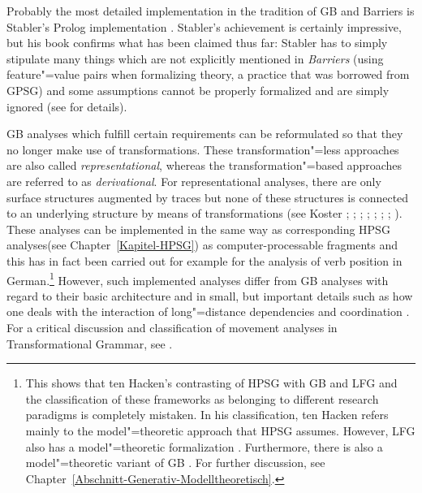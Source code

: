 Probably the most detailed implementation in the tradition of GB and Barriers is Stabler's Prolog implementation
\citeyearpar{Stabler92a-u}. Stabler's achievement is certainly impressive, but his book confirms what has been claimed thus far: Stabler has to simply stipulate many
things which are not explicitly mentioned in \emph{Barriers} (\eg using feature"=value pairs when
formalizing \xbar theory, a practice that was borrowed from GPSG\indexgpsg) and some assumptions
cannot be properly formalized and are simply ignored (see \citealp{Briscoe97a} for details). 

\largerpage
GB analyses\label{Seite-Representationelle-GB} which fulfill certain requirements can be reformulated so that they no longer make use of transformations.
These transformation"=less approaches are also called \emph{representational}, whereas the transformation"=based approaches are referred to as
\emph{derivational}. For representational analyses, there are only surface structures augmented by traces but none of these structures is connected
to an underlying structure by means of transformations (see \eg %
Koster \citeyear[\page ]{Koster78b-u}; \citeyear[]{Koster87a-u}; 
\citealp{KT91a}; \citealp[Section~1.4]{Haider93a}; 
\citealp[]{Frey93a}; \citealp[--88, 177--178]{Lohnstein93a-u}; \citealp[]{FC94a}; \citealp[]{Veenstra98a}).
These analyses can be implemented in the same way as corresponding HPSG analyses\indexhpsg (see
Chapter~\ref{Kapitel-HPSG}) as computer-processable fragments and this has in fact been carried out
for example for the analysis of verb position in German.\footnote{%
	This shows that ten Hacken's contrasting of HPSG with GB and LFG \citep[Section~4.3]{TenHacken2007a}
        and the classification of these frameworks as belonging to different research paradigms is
        completely mistaken. In his classification, ten Hacken refers mainly to the model"=theoretic
        approach that HPSG assumes. However, LFG also has a model"=theoretic formalization
        \citep{Kaplan89b}. Furthermore, there is also a model"=theoretic variant of GB
	\citep{Rogers98a-u}. For further discussion, see Chapter~\ref{Abschnitt-Generativ-Modelltheoretisch}. 
}
However, such implemented analyses differ from GB analyses with regard to their basic architecture and in small, but important details such as how one deals with
the interaction of long"=distance dependencies and coordination \citep{Gazdar81}. For a critical discussion and classification of movement analyses
in Transformational Grammar, see . 

